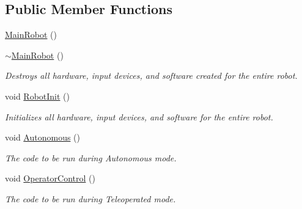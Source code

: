 \subsection*{\-Public \-Member \-Functions}
\begin{DoxyCompactItemize}
\item 
\hyperlink{class_main_robot_aef8d8dab2785deeac135bf10f56638bc}{\-Main\-Robot} ()
\item 
\hyperlink{class_main_robot_a850375c2d8b306e9ed5216e7362eb65a}{$\sim$\-Main\-Robot} ()
\begin{DoxyCompactList}\small\item\em \-Destroys all hardware, input devices, and software created for the entire robot. \end{DoxyCompactList}\item 
void \hyperlink{class_main_robot_a19cb0eb18abdb7afabf26b9e5fd454b7}{\-Robot\-Init} ()
\begin{DoxyCompactList}\small\item\em \-Initializes all hardware, input devices, and software for the entire robot. \end{DoxyCompactList}\item 
void \hyperlink{class_main_robot_a717c79b7473721ed0c1b2e994658b4aa}{\-Autonomous} ()
\begin{DoxyCompactList}\small\item\em \-The code to be run during \-Autonomous mode. \end{DoxyCompactList}\item 
void \hyperlink{class_main_robot_ad14b66387dd3e434ae7234508ba898ea}{\-Operator\-Control} ()
\begin{DoxyCompactList}\small\item\em \-The code to be run during \-Teleoperated mode. \end{DoxyCompactList}\end{DoxyCompactItemize}
